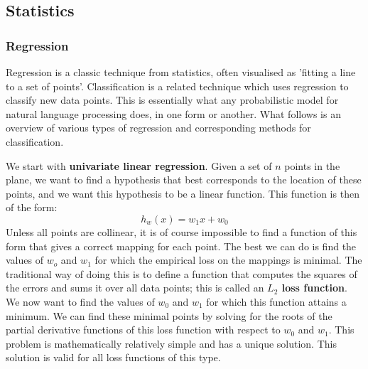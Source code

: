 \subsection{Statistics}
\label{sec:statistics}
    \subsubsection{Regression}

    Regression is a classic technique from statistics, often visualised as
    'fitting a line to a set of points'. Classification is a related
    technique which uses regression to classify new data points. This is
    essentially what any probabilistic model for natural language
    processing does, in one form or another. What follows is an overview
    of various types of regression and corresponding methods for
    classification.

    We start with \textbf{univariate linear regression}. Given a set
    of $n$ points in the plane, we want to find a hypothesis that best
    corresponds to the location of these points, and we want this
    hypothesis to be a linear function. This function is then of the form:
    \begin{equation}
      h_w(x) = w_1x + w_0
    \end{equation}
    Unless all points are collinear, it is of course impossible to
    find a function of this form that gives a correct mapping for each
    point. The best we can do is find the values of $w_o$ and $w_1$ for
    which the empirical loss on the mappings is minimal. The traditional
    way of doing this is to define a function that computes the squares of
    the errors and sums it over all data points; this is called an
    \textbf{$L_2$ loss function}. We now want to find the values of $w_0$
    and $w_1$ for which this function attains a minimum. We can find these
    minimal points by solving for the roots of the partial derivative
    functions of this loss function with respect to $w_0$ and $w_1$.  This
    problem is mathematically relatively simple and has a unique
    solution. This solution is valid for all loss functions of this type.

